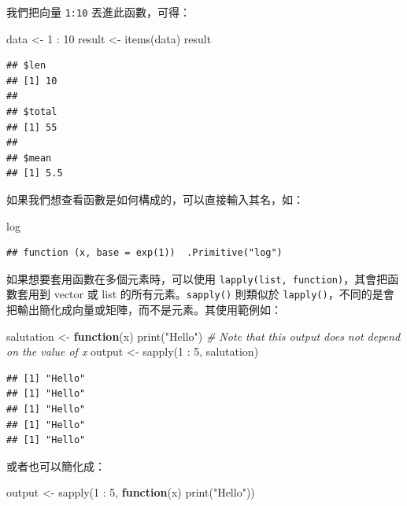 \documentclass[
]{book}
\newenvironment{Shaded}{\begin{snugshade}}{\end{snugshade}}
\newcommand{\CommentTok}[1]{\textcolor[rgb]{0.56,0.35,0.01}{\textit{#1}}}
\newcommand{\ControlFlowTok}[1]{\textcolor[rgb]{0.13,0.29,0.53}{\textbf{#1}}}
\newcommand{\DecValTok}[1]{\textcolor[rgb]{0.00,0.00,0.81}{#1}}
\newcommand{\FunctionTok}[1]{\textcolor[rgb]{0.00,0.00,0.00}{#1}}
\newcommand{\NormalTok}[1]{#1}
\newcommand{\OtherTok}[1]{\textcolor[rgb]{0.56,0.35,0.01}{#1}}
\newcommand{\SpecialCharTok}[1]{\textcolor[rgb]{0.00,0.00,0.00}{#1}}
\newcommand{\StringTok}[1]{\textcolor[rgb]{0.31,0.60,0.02}{#1}}
\theoremstyle{definition}
\theoremstyle{remark}
\begin{document}
我們把向量 \texttt{1:10} 丟進此函數，可得：

\begin{Shaded}
\begin{Highlighting}[]
\NormalTok{data }\OtherTok{\textless{}{-}} \DecValTok{1} \SpecialCharTok{:} \DecValTok{10}
\NormalTok{result }\OtherTok{\textless{}{-}} \FunctionTok{items}\NormalTok{(data)}
\NormalTok{result}
\end{Highlighting}
\end{Shaded}

\begin{verbatim}
## $len
## [1] 10
## 
## $total
## [1] 55
## 
## $mean
## [1] 5.5
\end{verbatim}

如果我們想查看函數是如何構成的，可以直接輸入其名，如：

\begin{Shaded}
\begin{Highlighting}[]
\NormalTok{log}
\end{Highlighting}
\end{Shaded}

\begin{verbatim}
## function (x, base = exp(1))  .Primitive("log")
\end{verbatim}

如果想要套用函數在多個元素時，可以使用 \texttt{lapply(list,\ function)}，其會把函數套用到 vector 或 list 的所有元素。\texttt{sapply()} 則類似於 \texttt{lapply()}，不同的是會把輸出簡化成向量或矩陣，而不是元素。其使用範例如：

\begin{Shaded}
\begin{Highlighting}[]
\NormalTok{salutation }\OtherTok{\textless{}{-}} \ControlFlowTok{function}\NormalTok{(x) }\FunctionTok{print}\NormalTok{(}\StringTok{"Hello"}\NormalTok{)}
\CommentTok{\# Note that this output does not depend on the value of x}
\NormalTok{output }\OtherTok{\textless{}{-}} \FunctionTok{sapply}\NormalTok{(}\DecValTok{1} \SpecialCharTok{:} \DecValTok{5}\NormalTok{, salutation)}
\end{Highlighting}
\end{Shaded}

\begin{verbatim}
## [1] "Hello"
## [1] "Hello"
## [1] "Hello"
## [1] "Hello"
## [1] "Hello"
\end{verbatim}

或者也可以簡化成：

\begin{Shaded}
\begin{Highlighting}[]
\NormalTok{output }\OtherTok{\textless{}{-}} \FunctionTok{sapply}\NormalTok{(}\DecValTok{1} \SpecialCharTok{:} \DecValTok{5}\NormalTok{, }\ControlFlowTok{function}\NormalTok{(x) }\FunctionTok{print}\NormalTok{(}\StringTok{"Hello"}\NormalTok{))}
\end{Highlighting}
\end{Shaded}
\end{document}
